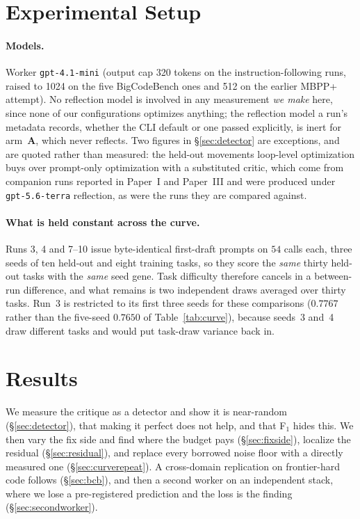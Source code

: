 \documentclass[11pt]{article}
\begin{document}
\section{Experimental Setup}
\label{sec:setup}

\paragraph{Models.} Worker \texttt{gpt-4.1-mini} (output cap 320 tokens on the
instruction-following runs, raised to 1024 on the five BigCodeBench ones and 512 on the earlier
MBPP+ attempt). No reflection model is
involved in any measurement \emph{we make} here, since none of our configurations optimizes
anything; the reflection model a run's metadata records, whether the CLI default or one passed
explicitly, is inert for arm~\textbf{A}, which never reflects.
Two figures in \S\ref{sec:detector} are exceptions, and are quoted rather than measured: the
held-out movements loop-level optimization buys over prompt-only optimization with a substituted
critic, which come from companion runs reported in Paper~I and Paper~III and were produced under
\texttt{gpt-5.6-terra} reflection, as were the runs they are compared against.

\paragraph{What is held constant across the curve.} Runs 3, 4 and 7--10 issue byte-identical
first-draft prompts on $54$ calls each, three seeds of ten held-out and eight training tasks,
so they score the \emph{same} thirty held-out tasks with the \emph{same} seed gene. Task
difficulty therefore cancels in a between-run difference, and what remains is two independent
draws averaged over thirty tasks. Run~3 is restricted to its first three seeds for these comparisons ($0.7767$ rather than the
five-seed $0.7650$ of Table~\ref{tab:curve}), because seeds~3 and~4 draw different tasks and
would put task-draw variance back in.

\section{Results}
\label{sec:results}

We measure the critique as a detector and show it is near-random (\S\ref{sec:detector}), that
making it perfect does not help, and that F$_1$ hides this. We then vary the fix side and find
where the budget pays (\S\ref{sec:fixside}), localize the residual (\S\ref{sec:residual}), and
replace every borrowed noise floor with a directly measured one (\S\ref{sec:curverepeat}). A
cross-domain replication on frontier-hard code follows (\S\ref{sec:bcb}), and then a second
worker on an independent stack, where we lose a pre-registered prediction and the loss is the
finding (\S\ref{sec:secondworker}).
\end{document}
